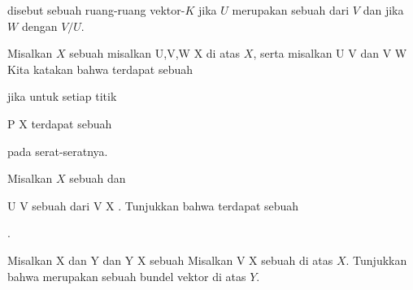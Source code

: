 disebut sebuah  ruang-ruang vektor-$K$ jika $U$ merupakan sebuah
dari $V$ dan jika $W$
dengan
$V/U$.

Misalkan $X$ sebuah
misalkan
\maabbdisp {} {U,V,W} {X
} {}
di atas $X$, serta misalkan
\maabb {\varphi} { U } { V
} {}
dan
\maabb {\psi} { V } { W
} {}
Kita katakan bahwa terdapat sebuah

 {  }

jika untuk setiap titik

\mavergleichskette
{\vergleichskette
{ P
}
{ \in }{ X
}
{  }{
}
{    }{
}
{   }{
}
}
{}{}{}
terdapat sebuah

 {  }

pada serat-seratnya.

{}
{

Misalkan $X$ sebuah
dan

\mavergleichskette
{\vergleichskette
{ U
}
{ \subseteq }{ V
}
{  }{
}
{    }{
}
{   }{
}
}
{}{}{}
sebuah
dari
\maabb {} { V } { X
} {.}
Tunjukkan bahwa terdapat sebuah

 {  }.

}
{} {}

{}
{

Misalkan
\mathkor {} {X} {dan} {Y} {}
dan
\maabb {\varphi} { Y } { X
} {}
sebuah
Misalkan
 { V } { X
} {}
sebuah
di atas $X$. Tunjukkan bahwa
 {} {}
merupakan sebuah bundel vektor di atas $Y$.

}
{} {}

